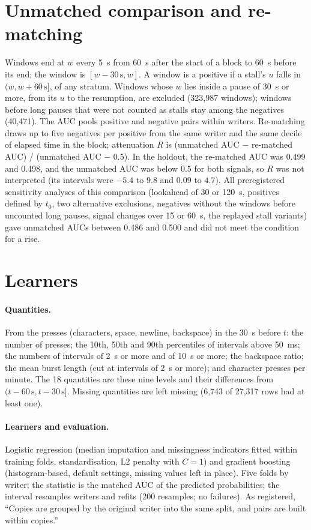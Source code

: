 \section{Unmatched comparison and re-matching}
\label{app:unmatched}

Windows end at $w$ every 5~s from 60~s after the start of a block to 60~s before its end; the window is $[w - 30\,
\mathrm{s}, w]$. A window is a positive if a stall's $u$ falls in $(w, w + 60\,\mathrm{s}]$, of any stratum. Windows
whose $w$ lies inside a pause of 30~s or more, from its $u$ to the resumption, are excluded (323,987 windows); windows
before long pauses that were not counted as stalls stay among the negatives (40,471). The AUC pools positive and
negative pairs within writers. Re-matching draws up to five negatives per positive from the same writer and the same
decile of elapsed time in the block; attenuation $R$ is (unmatched AUC $-$ re-matched AUC) / (unmatched AUC $-$ 0.5).
In the holdout, the re-matched AUC was 0.499 and 0.498, and the unmatched AUC was below 0.5 for both signals, so $R$ was
not interpreted (its intervals were $-5.4$ to $9.8$ and $0.09$ to $4.7$). All preregistered sensitivity analyses of this
comparison (lookahead of 30 or 120~s, positives defined by $t_0$, two alternative exclusions, negatives without the
windows before uncounted long pauses, signal changes over 15 or 60~s, the replayed stall variants) gave unmatched AUCs
between 0.486 and 0.500 and did not meet the condition for a rise.

\section{Learners}
\label{app:learners}

\paragraph{Quantities.} From the presses (characters, space, newline, backspace) in the 30~s before $t$: the number of
presses; the 10th, 50th and 90th percentiles of intervals above 50~ms; the numbers of intervals of 2~s or more and of
10~s or more; the backspace ratio; the mean burst length (cut at intervals of 2~s or more); and character presses per
minute. The 18 quantities are these nine levels and their differences from $(t - 60\,\mathrm{s}, t - 30\,\mathrm{s}]$.
Missing quantities are left missing (6,743 of 27,317 rows had at least one).

\paragraph{Learners and evaluation.} Logistic regression (median imputation and missingness indicators fitted within
training folds, standardisation, L2 penalty with $C = 1$) and gradient boosting (histogram-based, default settings,
missing values left in place). Five folds by writer; the statistic is the matched AUC of the predicted probabilities;
the interval resamples writers and refits (200 resamples; no failures). As registered, ``Copies are grouped by the
original writer into the same split, and pairs are built within copies.''

